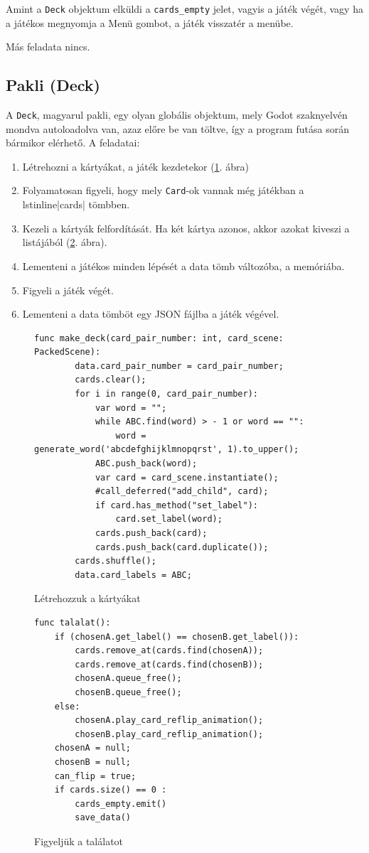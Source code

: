 Amint a \lstinline|Deck| objektum elküldi a \lstinline{cards_empty} jelet, vagyis a játék végét, vagy ha a játékos megnyomja a Menü gombot, a játék visszatér a menübe. 

Más feladata nincs. 


\subsection{Pakli (Deck)}
A \lstinline|Deck|, magyarul pakli, egy olyan globális objektum, mely Godot szaknyelvén mondva autoloadolva van, azaz előre be van töltve, így a program futása során bármikor elérhető. A feladatai: 
\begin{enumerate}
\item Létrehozni a kártyákat, a játék kezdetekor (\ref{code:make_deck}. ábra)
\item Folyamatosan figyeli, hogy mely \lstinline|Card|-ok vannak még játékban a lstinline|cards| tömbben.
\item Kezeli a kártyák felfordítását. Ha két kártya azonos, akkor azokat kiveszi a listájából (\ref{code:talalat}. ábra).
\item Lementeni a játékos minden lépését a data tömb változóba, a memóriába. 
\item Figyeli a játék végét.
\item Lementeni a data tömböt egy JSON fájlba a játék végével.
\end{enumerate}

\begin{figure}[h]
    \centering
    \begin{lstlisting}[language=GDScript]
    func make_deck(card_pair_number: int, card_scene: PackedScene):
        data.card_pair_number = card_pair_number;
        cards.clear();
        for i in range(0, card_pair_number):
            var word = "";
            while ABC.find(word) > - 1 or word == "":
                word = generate_word('abcdefghijklmnopqrst', 1).to_upper();
            ABC.push_back(word);
            var card = card_scene.instantiate();
            #call_deferred("add_child", card);
            if card.has_method("set_label"):
                card.set_label(word);
            cards.push_back(card);
            cards.push_back(card.duplicate());
        cards.shuffle();
        data.card_labels = ABC;
    \end{lstlisting}
    \caption{Létrehozzuk a kártyákat}
    \label{code:make_deck}
\end{figure}
\begin{figure}[h]
    \centering
    \begin{lstlisting}[language=GDScript]
func talalat():
	if (chosenA.get_label() == chosenB.get_label()):
		cards.remove_at(cards.find(chosenA));
		cards.remove_at(cards.find(chosenB));
		chosenA.queue_free();
		chosenB.queue_free();
	else:
		chosenA.play_card_reflip_animation();
		chosenB.play_card_reflip_animation();
	chosenA = null;
	chosenB = null;
	can_flip = true;
	if cards.size() == 0 :
		cards_empty.emit()
		save_data()
    \end{lstlisting}
    \caption{Figyeljük a találatot}
    \label{code:talalat}
\end{figure}


